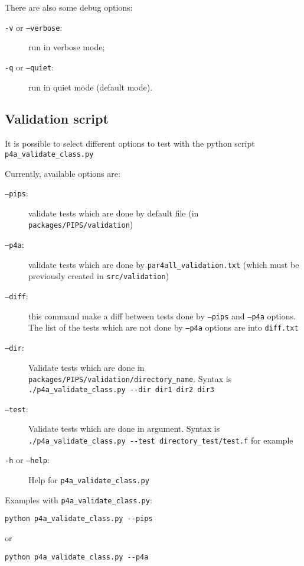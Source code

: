 \documentclass[a4paper]{article}
\begin{document}
There are also some debug options:
\begin{description}
\item[\texttt{-v} or \texttt{--verbose}:] run in verbose mode;

\item[\texttt{-q} or \texttt{--quiet}:] run in quiet mode (default mode).
\end{description}


\subsection{Validation script}
\label{sec:validation_script}

It is possible to select different options to test with the python script
\verb|p4a_validate_class.py|

Currently, available options are:
\begin{description}
\item[\texttt{--pips}:] validate tests which are done by default file (in
  \texttt{packages/PIPS/validation})

\item[\texttt{--p4a}:] validate tests which are done by
  \verb|par4all_validation.txt| (which must be previously created in
  \texttt{src/validation})

\item[\texttt{--diff}:] this command make a diff between tests done by
  \texttt{--pips} and \texttt{--p4a} options. The list of the tests which
  are not done by \texttt{--p4a} options are into \texttt{diff.txt}

\item[\texttt{--dir}:] Validate tests which are done in \verb|packages/PIPS/validation/directory_name|. Syntax is \verb|./p4a_validate_class.py --dir dir1 dir2 dir3|

\item[\texttt{--test}:] Validate tests which are done in argument. Syntax is \verb|./p4a_validate_class.py --test directory_test/test.f| for example

\item[\texttt{-h} or \texttt{--help}:] Help for \verb|p4a_validate_class.py|
\end{description}

Examples with \verb|p4a_validate_class.py|:
\begin{verbatim}
python p4a_validate_class.py --pips
\end{verbatim}
or
\begin{verbatim}
python p4a_validate_class.py --p4a
\end{verbatim}
\end{document}
